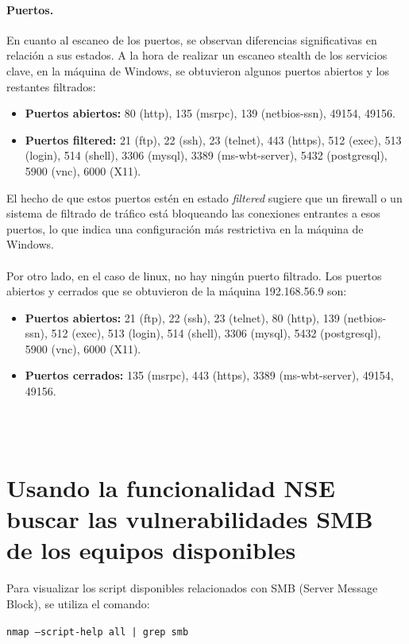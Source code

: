 \documentclass[a4paper,12pt]{article} %
\begin{document}
\paragraph{Puertos.}
 En cuanto al escaneo de los puertos, se observan diferencias significativas en relación a sus estados. A la hora de realizar un escaneo stealth de los servicios clave, en la máquina de Windows, se obtuvieron algunos puertos abiertos y los restantes filtrados:
\begin{itemize}
    \item \textbf{Puertos abiertos: }80 (http), 135 (msrpc), 139 (netbios-ssn), 49154, 49156.
    \item \textbf{Puertos filtered: }21 (ftp), 22 (ssh), 23 (telnet), 443 (https), 512 (exec), 513 (login), 514 (shell), 3306 (mysql), 3389 (ms-wbt-server), 5432 (postgresql), 5900 (vnc), 6000 (X11).
\end{itemize}
El hecho de que estos puertos estén en estado \textit{filtered} sugiere que un firewall o un sistema de filtrado de tráfico está bloqueando las conexiones entrantes a esos puertos, lo que indica una configuración más restrictiva en la máquina de Windows.
\\ \\
Por otro lado, en el caso de linux, no hay ningún puerto filtrado. Los puertos abiertos y cerrados que se obtuvieron de la máquina 192.168.56.9 son:
\begin{itemize}
    \item \textbf{Puertos abiertos: }  21 (ftp), 22 (ssh), 23 (telnet), 80 (http), 139 (netbios-ssn), 512 (exec), 513 (login), 514 (shell), 3306 (mysql), 5432 (postgresql), 5900 (vnc), 6000 (X11).
    \item \textbf{Puertos cerrados: } 135 (msrpc), 443 (https), 3389 (ms-wbt-server), 49154, 49156.
\end{itemize}


\\ \\
\section{Usando la funcionalidad NSE buscar las vulnerabilidades SMB de los equipos disponibles}

Para visualizar los script disponibles relacionados con SMB (Server Message Block), se utiliza el comando: 

    \begin{center}
    \texttt{nmap --script-help all | grep smb}
    \end{center}
    
\end{document}
